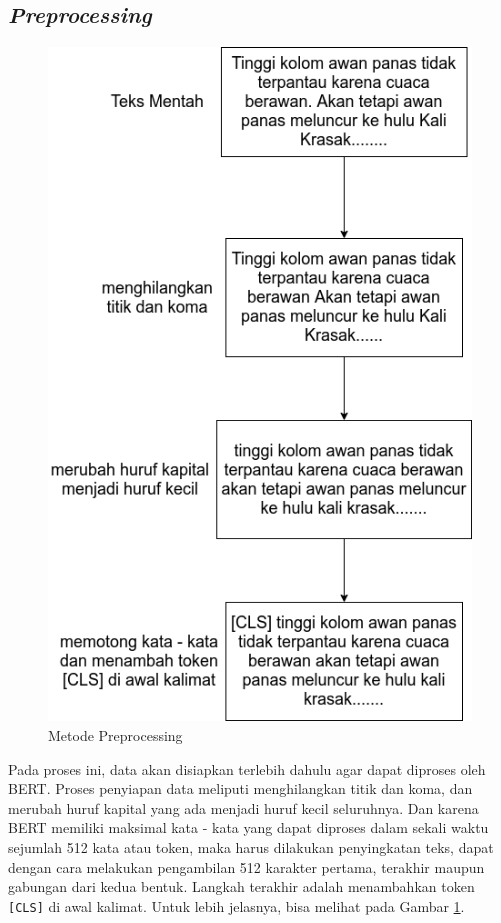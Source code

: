 \subsection{\textit{Preprocessing}}

\begin{figure}[h!]
    \begin{center}
        \includegraphics[width= .7\linewidth]{gambar/preprocess_long.png}
        \caption{Metode Preprocessing}
        \label{fig: metodologi_preprocessing}
    \end{center}
\end{figure}

Pada proses ini, data akan disiapkan terlebih dahulu agar dapat diproses oleh BERT. Proses penyiapan data meliputi menghilangkan titik dan koma, dan merubah huruf kapital yang ada menjadi huruf kecil seluruhnya. Dan karena BERT memiliki maksimal kata - kata yang dapat diproses dalam sekali waktu sejumlah 512 kata atau token, maka harus dilakukan penyingkatan teks, dapat dengan cara melakukan pengambilan 512 karakter pertama, terakhir maupun gabungan dari kedua bentuk. Langkah terakhir adalah menambahkan token \texttt{[CLS]} di awal kalimat. Untuk lebih jelasnya, bisa melihat pada Gambar \ref{fig: metodologi_preprocessing}.

